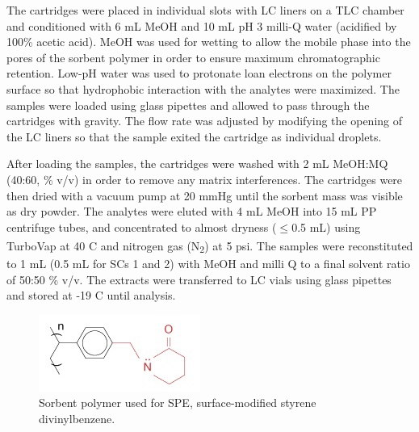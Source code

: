 The cartridges were placed in individual slots with LC liners on a TLC chamber and conditioned with 6 mL MeOH and 10 mL pH 3 milli-Q water (acidified by 100\% acetic acid). MeOH was used for wetting to allow the mobile phase into the pores of the sorbent polymer in order to ensure maximum chromatographic retention. Low-pH water was used to protonate loan electrons on the polymer surface so that hydrophobic interaction with the analytes were maximized. The samples were loaded using glass pipettes and allowed to pass through the cartridges with gravity. The flow rate was adjusted by modifying the opening of the LC liners so that the sample exited the cartridge as individual droplets. 

After loading the samples, the cartridges were washed with 2 mL MeOH:MQ (40:60, \% v/v) in order to remove any matrix interferences. The cartridges were then dried with a vacuum pump at 20 mmHg until the sorbent mass was visible as dry powder. The analytes were eluted with 4 mL MeOH into 15 mL PP centrifuge tubes, and concentrated to almost dryness ($\le$0.5 mL) using TurboVap\textsuperscript{\textregistered} at 40 \textdegree C and nitrogen gas (N\textsubscript{2}) at 5 psi. The samples were reconstituted to 1 mL (0.5 mL for SCs 1 and 2) with MeOH and milli Q to a final solvent ratio of 50:50 \% v/v. The extracts were transferred to LC vials using glass pipettes and stored at -19 \textdegree C until analysis.

\begin{figure}
    \centering
    \includegraphics{Bilder/SPE_LCMS/mg_spe_strata-x.jpg}
    \caption{Sorbent polymer used for SPE, surface-modified styrene divinylbenzene.}
    \label{fig:StatPhase}
\end{figure}

